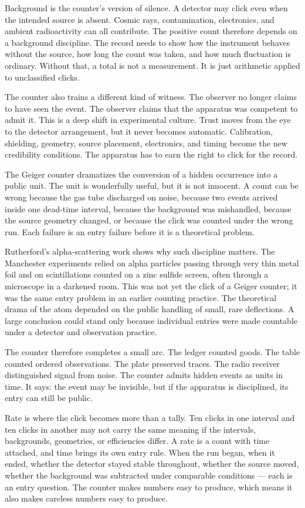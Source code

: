 Background is the counter's version of silence. A detector may click even when
the intended source is absent. Cosmic rays, contamination, electronics, and
ambient radioactivity can all contribute. The positive count therefore depends
on a background discipline. The record needs to show how the instrument
behaves without the source, how long the count was taken, and how much
fluctuation is ordinary.
Without that, a total is not a measurement. It is just arithmetic applied to
unclassified clicks.

The counter also trains a different kind of witness. The observer no longer
claims to have seen the event. The observer claims that the apparatus was
competent to admit it. This is a deep shift in experimental culture. Trust
moves from the eye to the detector arrangement, but it never becomes
automatic. Calibration, shielding, geometry, source placement, electronics,
and timing become the new credibility conditions. The apparatus has to earn
the right to click for the record.

The Geiger counter dramatizes the conversion of a hidden occurrence into a
public unit. The unit is wonderfully useful, but it is not innocent. A count
can be wrong because the gas tube discharged on noise, because two events
arrived inside one dead-time interval, because the background was mishandled,
because the source geometry changed, or because the click was counted under
the wrong run. Each failure is an entry failure before it is a theoretical
problem.

Rutherford's alpha-scattering work shows why such discipline matters. The
Manchester experiments relied on alpha particles passing through very thin
metal foil and on scintillations counted on a zinc sulfide screen, often
through a microscope in a darkened room. This was not yet the click of a
Geiger counter; it was the same entry problem in an earlier counting
practice. The theoretical drama of the atom depended on the public handling
of small, rare deflections. A large conclusion could stand only because
individual entries were made countable under a detector and observation
practice.

The counter therefore completes a small arc. The ledger counted goods. The
table counted ordered observations. The plate preserved traces. The radio
receiver distinguished signal from noise. The counter admits hidden events as
units in time. It says: the event may be invisible, but if the apparatus is
disciplined, its entry can still be public.

Rate is where the click becomes more than a tally. Ten clicks in one interval
and ten clicks in another may not carry the same meaning if the intervals,
backgrounds, geometries, or efficiencies differ. A rate is a count with time
attached, and time brings its own entry rule. When the run began, when it
ended, whether the detector stayed stable throughout, whether the source
moved, whether the background was subtracted under comparable conditions
--- each is an entry question. The counter makes numbers
easy to produce, which means it also makes careless numbers easy to produce.

